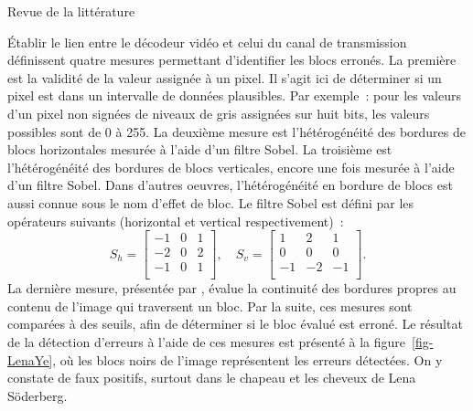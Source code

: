 \documentclass[letterpaper, twoside, 12pt,memoire]{thETS}
\newcommand{\fig}[1]{figure~\ref{#1}}
\begin{document}
\begin{chapter}{Revue de la littérature}
\begin{section}{Établir le lien entre le décodeur vidéo et celui du canal de
transmission}
\citeauthor{Ye2003} définissent quatre mesures permettant d'identifier les blocs
erronés. La première est la validité de la valeur assignée à un pixel. Il s'agit
ici de déterminer si un pixel est dans un intervalle de données plausibles. Par
exemple~: pour les valeurs d'un pixel non signées de niveaux de gris assignées
sur huit bits, les valeurs possibles sont de 0 à 255. La deuxième mesure est
l'hétérogénéité des bordures de blocs horizontales mesurée à l'aide d'un filtre
Sobel. La troisième est l'hétérogénéité des bordures de blocs verticales, encore
une fois mesurée à l'aide d'un filtre Sobel. Dans d'autres oeuvres,
l'hétérogénéité en bordure de blocs est aussi connue sous le nom d'effet de
bloc. Le filtre Sobel est défini par les opérateurs suivants (horizontal et vertical respectivement)~:
\begin{equation}
S_h =
\begin{bmatrix}
-1 & 0 & 1\\
-2 & 0 & 2\\
-1 & 0 & 1\\
\end{bmatrix}, \quad
S_v =
\begin{bmatrix}
1 & 2 & 1\\
0 & 0 & 0\\
-1 & -2 & -1\\
\end{bmatrix}.
\end{equation}
La dernière mesure, présentée par \citeauthor{Ye2003}, évalue la continuité des
bordures propres au contenu de l'image qui traversent un bloc. Par la suite, ces
mesures sont comparées à des seuils, afin de déterminer si le bloc évalué est
erroné. Le résultat de la détection d'erreurs à l'aide de ces mesures est
présenté à la \fig{fig-LenaYe}, où les blocs noirs de l'image
 représentent les erreurs détectées. On y constate de
faux positifs, surtout dans le chapeau et les cheveux de Lena Söderberg.
\begin{figure}
\end{figure}
\end{section}
\end{chapter}
\end{document}
